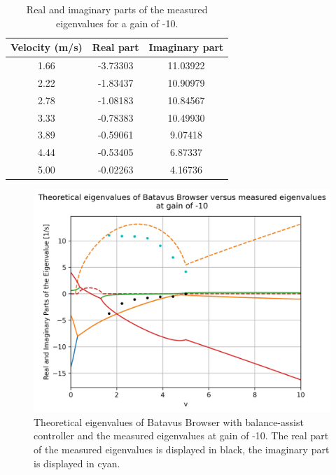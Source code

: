 \documentclass[12pt]{article}
\begin{document}
\begin{table}[]
    \centering
    \caption{Real and imaginary parts of the measured eigenvalues for a gain of -10.}
    \label{table-eigenvalues-gain-10}
    \begin{tabular}{c|c|c}
        \textbf{Velocity (m/s)} & \textbf{Real part} & \textbf{Imaginary part} \\ \hline
        1.66                    & -3.73303          & 11.03922                 \\
        2.22                    & -1.83437          & 10.90979                 \\
        2.78                    & -1.08183          & 10.84567                 \\
        3.33                    & -0.78383          & 10.49930                 \\
        3.89                    & -0.59061          & 9.07418                 \\
        4.44                    & -0.53405          & 6.87337                 \\
        5.00                    & -0.02263          & 4.16736                
    \end{tabular}
\end{table}

\begin{figure}
    \centering
    \includegraphics[width=\columnwidth]{figures/gain-10-batavus-without-rider.png}
    \caption{Theoretical eigenvalues of Batavus Browser with balance-assist controller and the measured eigenvalues at gain of -10. The real part of the measured eigenvalues is displayed in black, the imaginary part is displayed  in cyan.}
    \label{gain-10-batavus-without-rider}
\end{figure}
\end{document}

